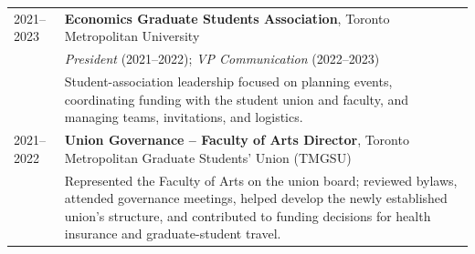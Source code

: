 \documentclass[11pt]{article}
\begin{document}
\begin{tabular}{p{2.5cm} p{15cm}}
  2021--2023 & \textbf{Economics Graduate Students Association}, Toronto Metropolitan University \\
  & \textit{President} (2021--2022); \textit{VP Communication} (2022--2023) \\
  & {\scriptsize Student-association leadership focused on planning events, coordinating funding with the student union and faculty, and managing teams, invitations, and logistics.} \\[4pt]
  2021--2022 & \textbf{Union Governance -- Faculty of Arts Director}, Toronto Metropolitan Graduate Students' Union (TMGSU) \\
  & {\scriptsize Represented the Faculty of Arts on the union board; reviewed bylaws, attended governance meetings, helped develop the newly established union's structure, and contributed to funding decisions for health insurance and graduate-student travel.} \\
\end{tabular}

\normalsize

\vfill
\end{document}
